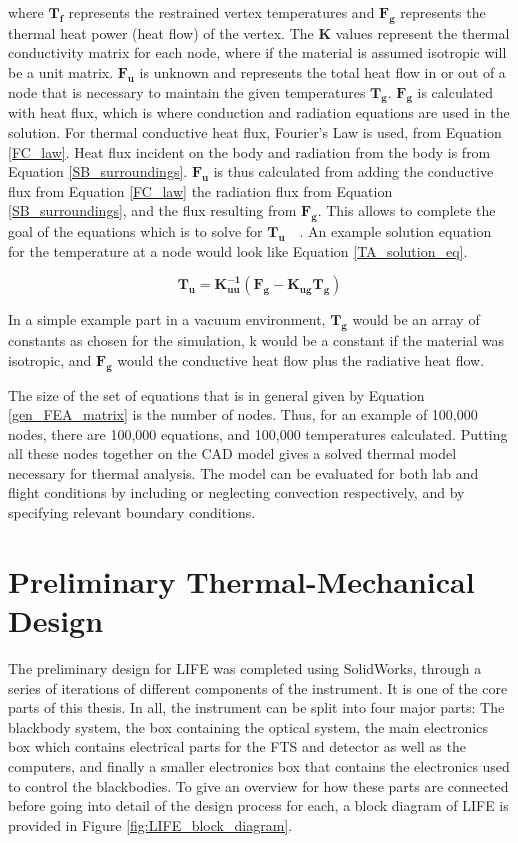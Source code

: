 where $\bm{T_f}$ represents the restrained vertex temperatures and $\bm{F_g}$ represents the thermal heat power (heat flow) of the vertex. The $\bm{K}$ values represent the thermal conductivity matrix for each node, where if the material is assumed isotropic will be a unit matrix. $\bm{F_u}$ is unknown and represents the total heat flow in or out of a node that is necessary to maintain the given temperatures $\bm{T_g}$. $\bm{F_g}$ is calculated with heat flux, which is where conduction and radiation equations are used in the solution. For thermal conductive heat flux, Fourier's Law is used, from Equation \ref{FC_law}. Heat flux incident on the body and radiation from the body is from Equation \ref{SB_surroundings}. $\bm{F_u}$ is thus calculated from adding the conductive flux from Equation \ref{FC_law} the radiation flux from Equation \ref{SB_surroundings}, and the flux resulting from $\bm{F_g}$. This allows to complete the goal of the equations which is to solve for $\bm{T_u}$~\citep{FEA_SW}~\citep{FEA_Procedures}. An example solution equation for the temperature at a node would look like Equation \ref{TA_solution_eq}.

\begin{equation}\label{TA_solution_eq}
    \bm{T_u = K_{uu}^{-1}(F_g-K_{ug}T_g)}
\end{equation}

In a simple example part in a vacuum environment, $\bm{T_g}$ would be an array of constants as chosen for the simulation, k would be a constant if the material was isotropic, and $\bm{F_g}$ would the conductive heat flow plus the radiative heat flow. 

The size of the set of equations that is in general given by Equation \ref{gen_FEA_matrix} is the number of nodes. Thus, for an example of 100,000 nodes, there are 100,000 equations, and 100,000 temperatures calculated. Putting all these nodes together on the CAD model gives a solved thermal model necessary for thermal analysis.  The model can be evaluated for both lab and flight conditions by including or neglecting convection respectively, and by specifying relevant boundary conditions. 

\section{Preliminary Thermal-Mechanical Design}\label{prelim_design}
The preliminary design for LIFE was completed using SolidWorks, through a series of iterations of different components of the instrument. It is one of the core parts of this thesis. In all, the instrument can be split into four major parts: The blackbody system, the box containing the optical system, the main electronics box which contains electrical parts for the FTS and detector as well as the computers, and finally a smaller electronics box that contains the electronics used to control the blackbodies. To give an overview for how these parts are connected before going into detail of the design process for each, a block diagram of LIFE is provided in Figure \ref{fig:LIFE_block_diagram}.

